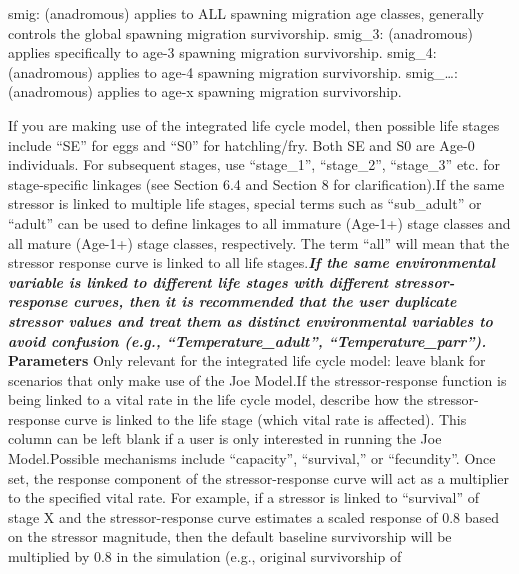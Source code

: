 \documentclass[
  letterpaper,
  DIV=11,
  numbers=noendperiod]{scrreprt}
\begin{document}
smig: (anadromous) applies to ALL spawning migration age classes,
generally controls the global spawning migration survivorship. smig\_3:
(anadromous) applies specifically to age-3 spawning migration
survivorship. smig\_4: (anadromous) applies to age-4 spawning migration
survivorship. smig\_\ldots: (anadromous) applies to age-x spawning
migration survivorship.

If you are making use of the integrated life cycle model, then possible
life stages include ``SE'' for eggs and ``S0'' for hatchling/fry. Both
SE and S0 are Age-0 individuals. For subsequent stages, use
``stage\_1'', ``stage\_2'', ``stage\_3'' etc. for stage-specific
linkages (see Section 6.4 and Section 8 for clarification).If the same
stressor is linked to multiple life stages, special terms such as
``sub\_adult'' or ``adult'' can be used to define linkages to all
immature (Age-1+) stage classes and all mature (Age-1+) stage classes,
respectively. The term ``all'' will mean that the stressor response
curve is linked to all life stages.\textbf{\emph{If the same
environmental variable is linked to different life stages with different
stressor-response curves, then it is recommended that the user duplicate
stressor values and treat them as distinct environmental variables to
avoid confusion (e.g., ``Temperature\_adult'', ``Temperature\_parr'').}}
\textbar{} \textbar{} \textbf{Parameters} \textbar{} Only relevant for
the integrated life cycle model: leave blank for scenarios that only
make use of the Joe Model.If the stressor-response function is being
linked to a vital rate in the life cycle model, describe how the
stressor-response curve is linked to the life stage (which vital rate is
affected). This column can be left blank if a user is only interested in
running the Joe Model.Possible mechanisms include ``capacity'',
``survival,'' or ``fecundity''. Once set, the response component of the
stressor-response curve will act as a multiplier to the specified vital
rate. For example, if a stressor is linked to ``survival'' of stage X
and the stressor-response curve estimates a scaled response of 0.8 based
on the stressor magnitude, then the default baseline survivorship will
be multiplied by 0.8 in the simulation (e.g., original survivorship of
\end{document}

